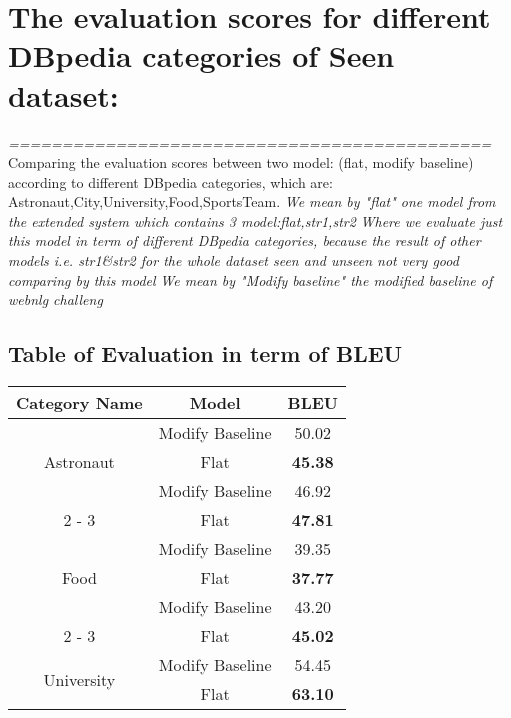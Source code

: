 \documentclass{article}%
\begin{document}
%
\normalsize%
\section{The evaluation scores for different DBpedia categories of Seen dataset:}%
\textit{=============================================\newline%
}%
Comparing the evaluation scores between two model: (flat, modify baseline) according to different DBpedia categories, which are: Astronaut,City,University,Food,SportsTeam.\newline%
%
\textit{We mean by "flat" one model from the extended system which contains 3 model:flat,str1,str2\newline%
}%
\textit{Where we evaluate just this model in term of different DBpedia categories, because the result of other models i.e. str1\&str2 for the whole dataset seen and unseen not very good comparing by this model\newline%
}%
\textit{We mean by "Modify baseline" the modified baseline of webnlg challeng \newline%
}%
\subsection{Table of Evaluation in term of BLEU \newline%
}%
\begin{tabular}{|c|c|c|}%
\hline%
\textbf{Category Name}&\textbf{Model}&\textbf{BLEU}\\%
\hline%
\multirow{3}{*}{Astronaut}&Modify Baseline&50.02\\%
\cline{2%
-%
3}%
&Flat&\textbf{45.38}\\%
\hline%
\hline%
\multirow{3}{*}{City}&Modify Baseline&46.92\\%
\cline{2%
-%
3}%
&Flat&\textbf{47.81}\\%
\hline%
\hline%
\multirow{3}{*}{Food}&Modify Baseline&39.35\\%
\cline{2%
-%
3}%
&Flat&\textbf{37.77}\\%
\hline%
\hline%
\multirow{3}{*}{SportTeam}&Modify Baseline&43.20\\%
\cline{2%
-%
3}%
&Flat&\textbf{45.02}\\%
\hline%
\hline%
\multirow{3}{*}{University}&Modify Baseline&54.45\\%
\cline{2%
-%
3}%
&Flat&\textbf{63.10}\\%
\hline%
\end{tabular}

%
\end{document}
